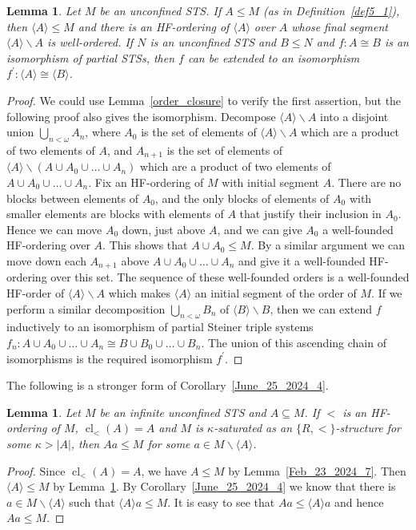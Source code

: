 \documentclass[a4paper, 11pt]{article}
\DeclareMathOperator{\cl}{cl}
\theoremstyle{note}
\newtheorem{lemma}[thm]{Lemma}
\begin{document}
\begin{lemma} \label{May_26_2024_2} Let $M$ be an unconfined STS.  If $A\leq M$ (as in Definition~\ref{def5_1}), then  $\langle A\rangle \leq M$ and there is an HF-ordering of $\langle A\rangle$ over $A$ whose final segment $\langle A\rangle \smallsetminus A$ is well-ordered. If $N$ is an unconfined STS and $B\leq N$ and $f:A\cong B$ is an isomorphism of partial STSs, then $f$ can be extended to an isomorphism $f^\prime :\langle A\rangle \cong \langle B \rangle$.
\end{lemma}
\begin{proof} We could use Lemma~\ref{order_closure} to verify the first assertion, but the following proof also gives the isomorphism. Decompose $\langle A\rangle\smallsetminus A$ into a disjoint union $\bigcup_{n<\omega}A_n$,  where $A_0$ is the set of elements of $\langle A\rangle\smallsetminus A$ which are a product of two elements of $A$,  and $A_{n+1}$ is the set of elements of  $\langle A\rangle\smallsetminus (A\cup A_0\cup \ldots\cup A_n)$  which are a product of two elements of  $A\cup A_0\cup\ldots\cup A_n$. Fix an HF-ordering of $M$ with initial segment $A$. There are no blocks between elements of $A_0$, and the only blocks of elements of $A_0$ with smaller elements are blocks with elements of $A$ that justify their inclusion in $A_0$. Hence we can move  $A_0$ down, just above $A$,  and we can give $A_0$ a well-founded HF-ordering over $A$. This shows that $A\cup A_0\leq M$. By a similar argument we can move down each $A_{n+1}$ above $A\cup A_0\cup \ldots \cup A_n$ and give it a well-founded HF-ordering over this set. The sequence of these well-founded orders is a well-founded HF-order of $\langle A\rangle \smallsetminus A$  which makes  $\langle A\rangle$ an initial segment of the order of $M$. If we perform a similar decomposition $\bigcup_{n<\omega}B_n$ of $\langle B\rangle\smallsetminus B$, then we can  extend $f$ inductively to an isomorphism of partial Steiner triple systems  $f_n : A\cup A_0 \cup \ldots \cup A_n\cong B\cup B_0\cup\ldots \cup B_n$. The union of this ascending chain of isomorphisms is the required isomorphism $f^\prime$.
\end{proof}

The following is a stronger form of Corollary~\ref{June_25_2024_4}.

\begin{lemma}\label{July_11_2024_1}  Let $M$ be an infinite unconfined  STS and $A\subseteq M$. If  $<$ is an HF-ordering of $M$, $\cl_<(A)=A$ and  $M$ is $\kappa$-saturated as an $\{R,<\}$-structure for some $\kappa>|A|$,  then  $Aa\leq M$ for some $a\in M\smallsetminus\langle A\rangle$.
\end{lemma}
\begin{proof} Since $\cl_<(A)=A$, we have $A\leq M$ by Lemma~\ref{Feb_23_2024_7}. Then $\langle A\rangle \leq M$ by Lemma~\ref{May_26_2024_2}.  By Corollary~\ref{June_25_2024_4} we know that there is $a\in M\smallsetminus \langle A\rangle$  such that  $\langle A\rangle a\leq M$. It is easy to see that  $Aa\leq \langle A\rangle a$ and hence  $Aa\leq M$.
\end{proof}
\end{document}
